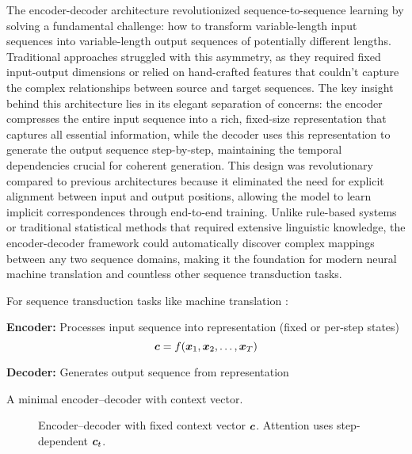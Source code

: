 The encoder-decoder architecture revolutionized sequence-to-sequence learning by solving a fundamental challenge: how to transform variable-length input sequences into variable-length output sequences of potentially different lengths. Traditional approaches struggled with this asymmetry, as they required fixed input-output dimensions or relied on hand-crafted features that couldn't capture the complex relationships between source and target sequences. The key insight behind this architecture lies in its elegant separation of concerns: the encoder compresses the entire input sequence into a rich, fixed-size representation that captures all essential information, while the decoder uses this representation to generate the output sequence step-by-step, maintaining the temporal dependencies crucial for coherent generation. This design was revolutionary compared to previous architectures because it eliminated the need for explicit alignment between input and output positions, allowing the model to learn implicit correspondences through end-to-end training. Unlike rule-based systems or traditional statistical methods that required extensive linguistic knowledge, the encoder-decoder framework could automatically discover complex mappings between any two sequence domains, making it the foundation for modern neural machine translation and countless other sequence transduction tasks.

For sequence transduction tasks like machine translation \cite{Cho2014,Bahdanau2014}:

\textbf{Encoder:} Processes input sequence into representation (fixed or per-step states)
\begin{equation}
\boldsymbol{c} = f(\boldsymbol{x}_1, \boldsymbol{x}_2, \ldots, \boldsymbol{x}_T)
\end{equation}

\textbf{Decoder:} Generates output sequence from representation


A minimal encoder–decoder with context vector.
\begin{figure}[h]
    \centering
    \caption{Encoder–decoder with fixed context vector $\boldsymbol{c}$. Attention uses step-dependent $\boldsymbol{c}_t$.}
\end{figure}

